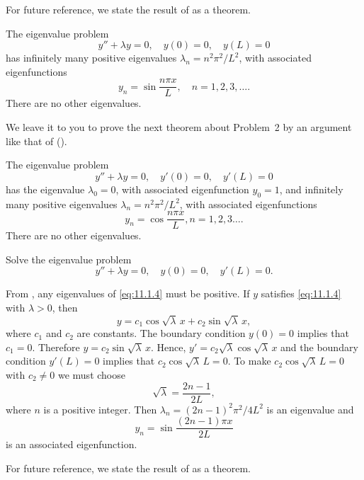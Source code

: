 For future reference, we state the result of 
as a theorem.

\begin{theorem}\label{thmtype:11.1.2}
The eigenvalue problem
\[
y''+\lambda y=0,\quad y(0)=0,\quad y(L)=0
\]
has infinitely many positive eigenvalues
$\lambda_n=n^2\pi^2/L^2$,
with associated eigenfunctions
\[
y_n=\sin \frac{n\pi x}{L},\quad
n=1,2,3,\dots.
\]
There are no other eigenvalues.
\end{theorem}


We leave it to you to prove the next theorem about Problem~2 by
an argument like that of 
().



\begin{theorem}\label{thmtype:11.1.3}
The eigenvalue problem
\[
y''+\lambda y=0,\quad y'(0)=0,\quad y'(L)=0
\]
has the eigenvalue $\lambda_0=0$, with associated eigenfunction
$y_0=1$, and infinitely many positive eigenvalues
$\lambda_n=n^2\pi^2/L^2$, with associated eigenfunctions
\[
y_n=\cos \frac{n\pi x}{L}, n=1,2,3\dots.
\]
There are no other eigenvalues.
\end{theorem}

\begin{example}[Problem 3] \label{example:11.1.2}
Solve the
eigenvalue problem
\begin{equation} \label{eq:11.1.4}
y''+\lambda y=0,\quad y(0)=0,\quad y'(L)=0.
\end{equation}
\end{example}

\begin{solution}
From ,
 any eigenvalues of \eqref{eq:11.1.4} must be  positive.
If $y$ satisfies \eqref{eq:11.1.4} with  $\lambda>0$, then
\[
y=c_1\cos\sqrt\lambda\, x+c_2\sin\sqrt\lambda\, x,
\]
where $c_1$ and $c_2$ are constants. The boundary condition $y(0)=0$
implies that $c_1=0$. Therefore $y=c_2\sin\sqrt\lambda\, x$. Hence,
$y'=c_2\sqrt\lambda\cos\sqrt\lambda\,x$ and the boundary condition
$y'(L)=0$ implies that $c_2\cos\sqrt\lambda\,L=0$. To make
$c_2\cos\sqrt\lambda\,L=0$ with $c_2\ne0$ we must choose
\[
\sqrt\lambda=\frac{2n-1}{2L},
\]
where $n$ is a positive integer. Then $\lambda_n=(2n-1)^2\pi^2/4L^2$
is an eigenvalue and
\[
y_n=\sin\frac{(2n-1)\pi x}{2L}
\]
is an associated eigenfunction.
\end{solution}

For future reference, we state the result of 
as a theorem.


